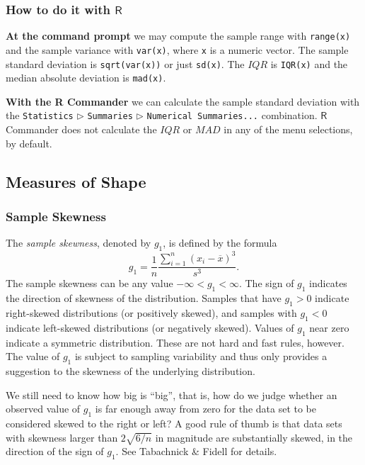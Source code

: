 \documentclass[10pt,english]{scrbook}
\begin{document}
\subsubsection[How to do it with \(\mathsf{R}\)]{How to do it with \(\mathsf{R}\)}
\label{sec-1-3-4-5}

\textbf{At the command prompt}
we may compute the sample range with \texttt{range(x)} and the sample variance with \texttt{var(x)}, where \texttt{x} is a numeric vector. The sample standard deviation is \texttt{sqrt(var(x))} or just \texttt{sd(x)}. The \(IQR\) is \texttt{IQR(x)} and the median absolute deviation is \texttt{mad(x)}.

\textbf{With the R Commander}
we can calculate the sample standard deviation with the \texttt{Statistics} \(\triangleright\) \texttt{Summaries} \(\triangleright\) \texttt{Numerical Summaries...} combination. \(\mathsf{R}\) Commander does not calculate the \(IQR\) or \(MAD\) in any of the menu selections, by default.
\subsection[Measures of Shape]{Measures of Shape}
\label{sec-1-3-5}

\subsubsection[Sample Skewness]{Sample Skewness}
\label{sec-1-3-5-1}

The \emph{sample skewness}, denoted by \(g_{1}\), is defined by the formula
\begin{equation}
g_{1}=\frac{1}{n}\frac{\sum_{i=1}^{n}(x_{i}-\overline{x})^{3}}{s^{3}}.
\end{equation}
The sample skewness can be any value \(-\infty<g_{1}<\infty\). The sign of \(g_{1}\) indicates the direction of skewness of the distribution. Samples that have \(g_{1}>0\) indicate right-skewed distributions (or positively skewed), and samples with \(g_{1}<0\) indicate left-skewed distributions (or negatively skewed). Values of \(g_{1}\) near zero indicate a symmetric distribution. These are not hard and fast rules, however. The value of \(g_{1}\) is subject to sampling variability and thus only provides a suggestion to the skewness of the underlying distribution. 

We still need to know how big is ``big'', that is, how do we judge whether an observed value of \(g_{1}\) is far enough away from zero for the data set to be considered skewed to the right or left? A good rule of thumb is that data sets with skewness larger than \(2\sqrt{6/n}\) in magnitude are substantially skewed, in the direction of the sign of \(g_{1}\). See Tabachnick \& Fidell \cite{Tabachnick2006} for details.
\end{document}
